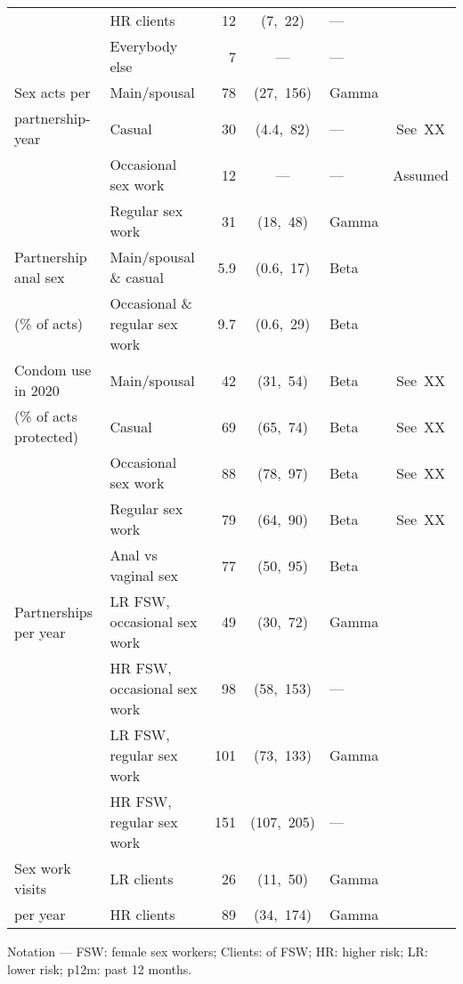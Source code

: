 \begin{tabular}{llRClc}
                          & HR clients                     &   12 &  (7,~22)   & ---      &         \\
                          & Everybody else                 &    7 &    ---     & ---      &         \\[1ex]
  Sex acts per            & Main/spousal                   &   78 & (27,~156)  & Gamma    &         \\
  partnership-year        & Casual                         &   30 & (4.4,~82)  & ---      & See~XX  \\
                          & Occasional sex work            &   12 &    ---     & ---      & Assumed \\
                          & Regular sex work               &   31 &  (18,~48)  & Gamma    &         \\[1ex]
  Partnership anal sex    & Main/spousal \& casual         &  5.9 & (0.6,~17)  & Beta     &         \\
  (\% of acts)            & Occasional \& regular sex work &  9.7 & (0.6,~29)  & Beta     &         \\[1ex]
  Condom use in 2020      & Main/spousal                   &   42 &  (31,~54)  & Beta     & See~XX  \\
  (\% of acts protected)  & Casual                         &   69 &  (65,~74)  & Beta     & See~XX  \\
                          & Occasional sex work            &   88 &  (78,~97)  & Beta     & See~XX  \\
                          & Regular sex work               &   79 &  (64,~90)  & Beta     & See~XX  \\
                          & Anal vs vaginal sex            &   77 &  (50,~95)  & Beta     &         \\[1ex]
  Partnerships per year   & LR FSW, occasional sex work    &   49 &  (30,~72)  & Gamma    &         \\
                          & HR FSW, occasional sex work    &   98 & (58,~153)  & ---      &         \\
                          & LR FSW, regular sex work       &  101 & (73,~133)  & Gamma    &         \\
                          & HR FSW, regular sex work       &  151 & (107,~205) & ---      &         \\[1ex]
  Sex work visits         & LR clients                     &   26 &  (11,~50)  & Gamma    &         \\
  per year                & HR clients                     &   89 & (34,~174)  & Gamma    &         \\
  \bottomrule
\end{tabular}
\floatfoot
Notation ---
FSW: female sex workers;
Clients: of FSW;
HR: higher risk;
LR: lower risk;
p12m: past 12 months.